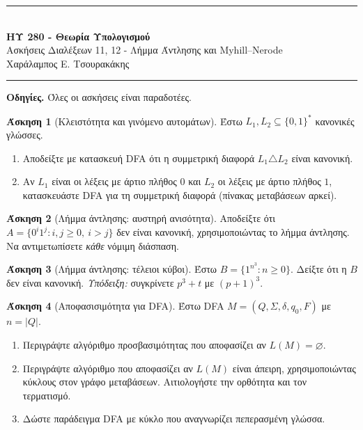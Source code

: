 \documentclass[11pt,a4paper]{article}
\theoremstyle{definition}\newtheorem{question}{Άσκηση}
\begin{document}
\begin{center}\rule{\linewidth}{.4pt}\\[3pt]{\large\bfseries ΗΥ 280 - Θεωρία Υπολογισμού}\\
Ασκήσεις Διαλέξεων 11, 12 - Λήμμα Άντλησης και Myhill--Nerode\\
Χαράλαμπος Ε. Τσουρακάκης\\\rule{\linewidth}{.4pt}\end{center}
\textbf{Οδηγίες.} Όλες οι ασκήσεις είναι παραδοτέες.

\begin{question}[Κλειστότητα και γινόμενο αυτομάτων]
Έστω $L_1,L_2\subseteq\{0,1\}^*$ κανονικές γλώσσες.
\begin{enumerate}
\item Αποδείξτε με κατασκευή DFA ότι η συμμετρική διαφορά $L_1\triangle L_2$ είναι κανονική.
\item Αν $L_1$ είναι οι λέξεις με άρτιο πλήθος $0$ και $L_2$ οι λέξεις με άρτιο πλήθος $1$, κατασκευάστε DFA για τη συμμετρική διαφορά (πίνακας μεταβάσεων αρκεί).
\end{enumerate}\end{question}

\begin{question}[Λήμμα άντλησης: αυστηρή ανισότητα]
Αποδείξτε ότι $A=\{0^i1^j:i,j\geq0,\ i>j\}$ δεν είναι κανονική, χρησιμοποιώντας το λήμμα άντλησης. Να αντιμετωπίσετε \emph{κάθε} νόμιμη διάσπαση.
\end{question}
 

\begin{question}[Λήμμα άντλησης: τέλειοι κύβοι]
Έστω $B=\{1^{n^3}:n\geq0\}$. Δείξτε ότι η $B$ δεν είναι κανονική. \textit{Υπόδειξη:} συγκρίνετε $p^3+t$ με $(p+1)^3$.
\end{question}

\begin{question}[Αποφασισιμότητα για DFA]
Έστω DFA $M=(Q,\Sigma,\delta,q_0,F)$ με $n=|Q|$.
\begin{enumerate}
\item Περιγράψτε αλγόριθμο προσβασιμότητας που αποφασίζει αν $L(M)=\varnothing$.
\item Περιγράψτε αλγόριθμο που αποφασίζει αν $L(M)$ είναι άπειρη, χρησιμοποιώντας κύκλους στον γράφο μεταβάσεων. Αιτιολογήστε την ορθότητα και τον τερματισμό.
\item Δώστε παράδειγμα DFA με κύκλο που αναγνωρίζει πεπερασμένη γλώσσα.
\end{enumerate}\end{question}
 
\end{document}
